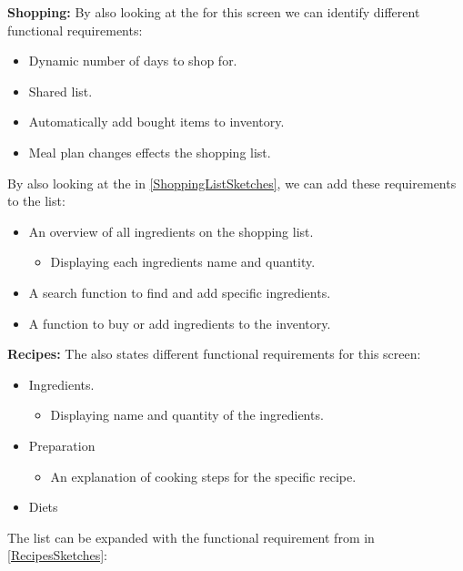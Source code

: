 \textbf{Shopping:}
By also looking at the  for this screen we can identify different functional requirements:

\begin{itemize}
	\item Dynamic number of days to shop for.
	\item Shared list.
	\item Automatically add bought items to inventory.
	\item Meal plan changes effects the shopping list.
\end{itemize} 

By also looking at the  in \cref{ShoppingListSketches}, we can add these requirements to the list:

\begin{itemize}
	\item An overview of all ingredients on the shopping list.
		\begin{itemize}
			\item Displaying each ingredients name and quantity.
		\end{itemize}		 
	\item A search function to find and add specific ingredients.
	\item A function to buy or add ingredients to the inventory.	
\end{itemize}

\textbf{Recipes:}
The  also states different functional requirements for this screen:

\begin{itemize}
	\item Ingredients.
		\begin{itemize}
			\item Displaying name and quantity of the ingredients.
		\end{itemize}
	\item Preparation
		\begin{itemize}
			\item An explanation of cooking steps for the specific recipe.
		\end{itemize}
	\item Diets
\end{itemize} 

The list can be expanded with the functional requirement from  in \cref{RecipesSketches}:

